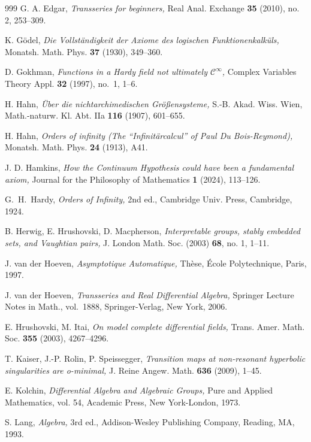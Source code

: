 \documentclass[]{amsart}
\numberwithin{equation}{section}
\theoremstyle{definition}
\theoremstyle{remark}
\begin{document}
\begin{thebibliography}{999}
G. A. Edgar, \textit{Transseries for beginners,} 
Real Anal. Exchange {\bf 35} (2010), no. 2, 253--309.

K. G\"odel,  \textit{Die Vollst\"andigkeit der Axiome des logischen Funktionenkalk\"uls,} Mo\-natsh. Math.
Phys. {\bf 37} (1930), 349--360.

D. Gokhman, {\it
Functions in a Hardy field not ultimately $\mathcal C^\infty$,} 
Complex Variables Theory Appl. {\bf 32} (1997), no.~1, 1--6.

H. Hahn, {\em \"Uber die nichtarchimedischen Gr\"o\ss{}ensysteme,}
S.-B. Akad. Wiss. Wien, Math.-na\-turw. Kl. Abt. IIa {\bf 116} (1907),
601--655.

H. Hahn, \textit{Orders of infinity \textup{(}The ``Infinit\"arcalcul'' of Paul Du Bois-Reymond\textup{)},} Monatsh. Math. Phys. {\bf 24} (1913), A41.

J. D. Hamkins, \textit{How the Continuum Hypothesis could have been a fundamental axiom,} Journal for the Philosophy of Mathematics {\bf 1} (2024), 113--126. 

G.~H.~Hardy, {\em Orders of Infinity,} 2nd ed., Cambridge Univ. Press, Cambridge, 1924. 

B. Herwig, E. Hrushovski, D. Macpherson, \textit{Interpretable groups, stably embedded sets, and 
Vaughtian pairs,} J. London Math. Soc. (2003) {\bf 68}, no. 1, 1--11.

 J. van der Hoeven, {\em Asymptotique Automatique,} Th\`ese,
\'Ecole Polytechnique, Paris, 1997.

 J. van der Hoeven, {\em Transseries and Real Differential Algebra,}
Springer Lecture Notes in Math., vol.~1888, Springer-Verlag, New York, 2006.

E. Hrushovski, M. Itai, {\it On model complete differential fields,}  Trans. Amer. Math. Soc. {\bf 355} (2003), 4267--4296.

T. Kaiser,  J.-P. Rolin, P. Speissegger, {\it Transition maps at non-resonant hyperbolic singularities are o-minimal,}  J. Reine Angew. Math. {\bf 636} (2009), 1--45. 
 
E. Kolchin, \textit{Differential Algebra and Algebraic Groups,}
Pure and Applied Mathematics, vol. 54, Academic Press, New York-London, 1973. 
 
S. Lang, {\em Algebra,} 3rd ed.,
Addison-Wesley Publishing Company, Reading, MA, 1993.


\end{thebibliography}
\end{document}

